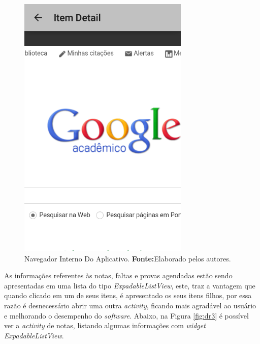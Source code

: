 \begin{figure}[h!]
	\centerline{\includegraphics[scale=0.5]{./imagens/3_discussao_resultados/dr2.png}}
	\caption[Navegador Interno Do Aplicativo]{Navegador Interno Do Aplicativo.
		\textbf{Fonte:}Elaborado pelos autores.}
	\label{fig:dr2}
\end{figure}
	
	\par As informações referentes às notas, faltas e provas agendadas estão sendo
apresentadas em uma lista do tipo \textit{ExpadableListView}, este, traz a
vantagem que quando clicado em um de seus itens, é apresentado os seus itens
filhos, por essa razão é desnecessário abrir uma outra \textit{activity},
ficando mais agradável ao usuário e melhorando o desempenho do
\textit{software}. Abaixo, na Figura \ref{fig:dr3} é possível ver a
\textit{activity} de notas, listando algumas informações com \textit{widget
ExpadableListView}.

